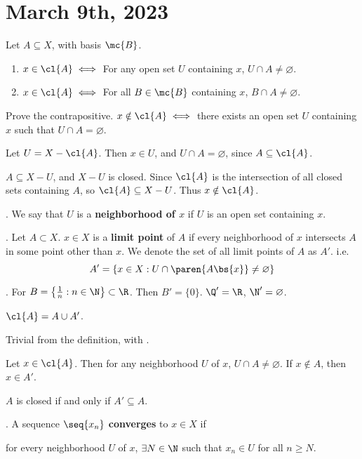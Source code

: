 \section*{March 9th, 2023}

 Let \(A \subseteq X\), with basis \(\mc{B}\).
\begin{enumerate}
    \item \(x \in \cl{A} \iff\) For any open set \(U\) containing \(x\), \(U \cap A \neq \varnothing\).
          \item\(x \in \cl{A} \iff\) For all \(B \in \mc{B}\) containing \(x\), \(B \cap A \neq \varnothing\).
\end{enumerate}

\pf {} Prove the contrapositive. \(x \notin \cl{A} \iff\) there exists an open set \(U\) containing \(x\) such that \(U \cap A = \varnothing\).

\note{\mimp} Let \(U = X - \cl{A}\). Then \(x \in U\), and \(U \cap A = \varnothing\), since \(A \subseteq \cl{A}\).

\note{\mimpd} \(A \subseteq X - U\), and \(X - U\) is closed. Since \(\cl{A}\) is the intersection of all closed sets containing \(A\), so \(\cl{A} \subseteq X - U\). Thus \(x \notin \cl{A}\).

. We say that \(U\) is a \textbf{neighborhood of \(x\)} if \(U\) is an open set containing \(x\).

.  Let \(A \subset X\). \(x \in X\) is a \textbf{limit point} of \(A\) if every neighborhood of \(x\) intersects \(A\) in some point other than \(x\). We denote the set of all limit points of \(A\) as \(A'\). i.e.
\[
    A' = \{x \in X : U \cap \paren{A \bs \{x\}} \neq \varnothing\}
\]


\ex. For \(B = \left\{\frac{1}{n} : n \in \N\right\} \subset \R\). Then \(B' = \{0\}\). \(\Q' = \R\), \(\N' = \varnothing\).

 \(\cl{A} = A \cup A'\).

\pf \note{\(\supset\)} Trivial from the definition, with .

\note{\(\subset\)} Let \(x \in \cl{A}\). Then for any neighborhood \(U\) of \(x\), \(U \cap A \neq \varnothing\). If \(x \notin A\), then \(x \in A'\).

 \(A\) is closed if and only if \(A' \subseteq A\).

. A sequence \(\seq{x_n}\) \textbf{converges} to \(x \in X\) if
\begin{center}
    for every neighborhood \(U\) of \(x\), \(\exists N \in \N\) such that \(x _n \in U\) for all \(n \geq N\).
\end{center}


